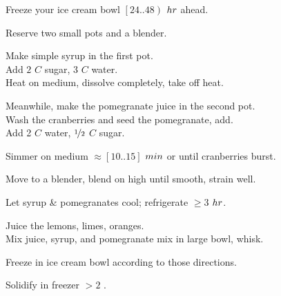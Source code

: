 \begin{preparation}
\item Freeze your ice cream bowl $\left[24 .. 48\right)$ $\hour$ ahead.
\item Reserve two small pots and a blender.
\item Make simple syrup in the first pot.\\
	Add $2$ $C$ sugar, 3 $C$ water.\\
	Heat on medium, dissolve completely, take off heat.
\item Meanwhile, make the pomegranate juice in the second pot.\\
	Wash the cranberries and seed the pomegranate, add.\\
	Add 2 $C$ water, $\onehalf$ $C$ sugar.
\item Simmer on medium $\approx [10..15]$ $\minute$ or until cranberries burst.
\item Move to a blender, blend on high until smooth, strain well.
\item Let syrup \& pomegranates cool; refrigerate $\ge3$ $\hour$.
\item Juice the lemons, limes, oranges.\\
	Mix juice, syrup, and pomegranate mix in large bowl, whisk.
\item Freeze in ice cream bowl according to those directions.
\item Solidify in freezer $>2$ \hour.
\end{preparation}


\recipeend%
